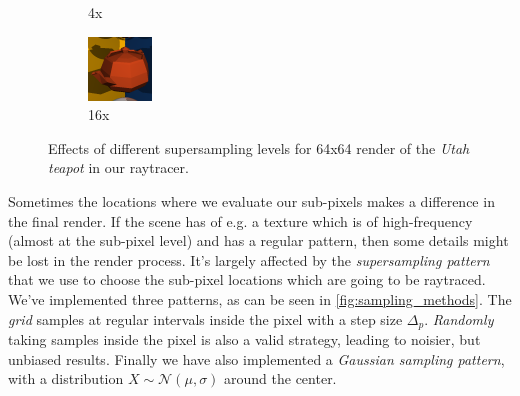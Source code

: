 \documentclass[a4paper, twocolumn]{article}
\begin{document}
\begin{figure}[ht]
\begin{subfigure}{0.32\linewidth}
                    \caption{4x}
                \end{subfigure} \hfill
                \begin{subfigure}{0.32\linewidth}
                    \centering
                    \label{fig:aliasing16x}
                    \includegraphics[width=\linewidth]{share/aliasing_16x.png}
                    \caption{16x}
                \end{subfigure}
                \caption{Effects of different supersampling levels for 64x64 render of the \emph{Utah teapot} in our raytracer.}
                \label{fig:aliasing}
            \end{figure}

            Sometimes the locations where we evaluate our sub-pixels makes a difference in the final render. If the scene has of e.g. a texture which is of high-frequency (almost at the sub-pixel level) and has a regular pattern, then some details might be lost in the render process. It's largely affected by the \emph{supersampling pattern} that we use to choose the sub-pixel locations which are going to be raytraced. We've implemented three patterns, as can be seen in \cref{fig:sampling_methods}. The \emph{grid} samples at regular intervals inside the pixel with a step size \(\Delta_p\). \emph{Randomly} taking samples inside the pixel is also a valid strategy, leading to noisier, but unbiased results. Finally we have also implemented a \emph{Gaussian sampling pattern}, with a distribution \(X \sim \mathcal{N}(\mu, \sigma)\) around the center.
\end{document}
